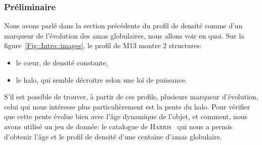 			\subsubsection{Préliminaire}
				Nous avons parlé dans la section précédente du profil de densité
				comme d'un marqueur de l'évolution des amas globulaires, nous allons
				voir en quoi. Sur la figure~\ref{Fig::Intro::images}, le profil de
				M13 montre 2 structures:
				\begin{itemize}
						\item le cœur, de densité constante,
						\item le halo, qui semble décroitre selon une loi de
							puissance.
				\end{itemize}
				S'il est possible de trouver, à partir de ces profils, plusieurs
				marqueur d'évolution, celui qui nous intéresse plus particulièrement
				est la pente du halo. Pour vérifier que cette pente évolue bien avec
				l'âge dynamique de l'objet, et comment, nous avons utilisé un jeu
				de donnée: le catalogue de \textsc{Harris}~\cite{Harris} qui nous a
				permis d'obtenir l'âge et le profil de densité d'une centaine d'amas
				globulaire.
				

